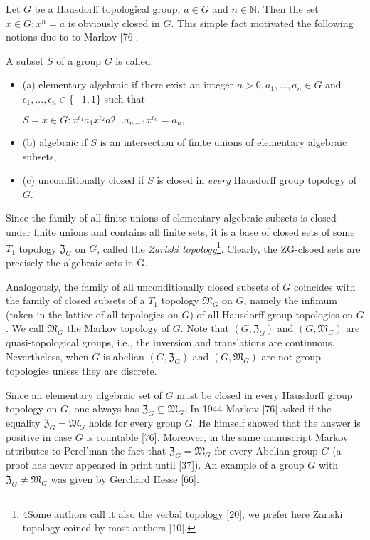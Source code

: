 \documentclass[12pt]{article}
\begin{document}
        Let $G$ be a Hausdorff topological group, $a \in G$ and $n \in \mathbb{N}$. Then the set ${x \in G : x^n = a}$ is obviously closed
    in $G$. This simple fact motivated the following notions due to to Markov [76].
    
    
        A subset $S$ of a group $G$ is called:

    
        \begin{itemize}

            \item (a) elementary algebraic if there exist an integer $n > 0, a_1, . . . , a_n \in G$ and $\epsilon_1, . . . , \epsilon_n \in \{-1, 1\}$ such that


                $S = {x \in G : x^{\epsilon_1} a_1 x^{\epsilon_2} a2 . . . a_{n-1} x^{\epsilon_n} = a_n},$


            \item (b) algebraic if $S$ is an intersection of finite unions of elementary algebraic subsets,

            \item (c) unconditionally closed if $S$ is closed in \emph{every} Hausdorff group topology of $G$.

        \end{itemize}

        Since the family of all finite unions of elementary algebraic subsets is closed under finite unions and contains
    all finite sets, it is a base of closed sets of some $T_1$ topology $\mathfrak{Z}_G$ on $G$, called
    the \emph{Zariski topology}\footnote[4]{4Some authors call it also the verbal topology [20], we prefer here Zariski topology coined by most authors [10].}.
    Clearly, the ZG-clsoed sets are precisely the algebraic sets in G.
    
    
        Analogously, the family of all unconditionally closed subsets of $G$ coincides with the family of closed subsets
    of a $T_1$ topology $\mathfrak{M}_G$ on $G$, namely the infimum (taken in the lattice of all topologies on $G$) of all Hausdorff group
    topologies on $G$. We call $\mathfrak{M}_G$ the Markov topology of $G$. Note that $(G, \mathfrak{Z}_G)$ and $(G,\mathfrak{M}_G)$ are quasi-topological
    groups, i.e., the inversion and translations are continuous. Nevertheless, when $G$ is abelian $(G, \mathfrak{Z}_G)$ and $(G,\mathfrak{M}_G)$
    are not group topologies unless they are discrete.
    
    
        Since an elementary algebraic set of $G$ must be closed in every Hausdorff group topology on $G$, one always
    has $\mathfrak{Z}_G \subseteq \mathfrak{M}_G$. In 1944 Markov [76] asked if the equality $\mathfrak{Z}_G = \mathfrak{M}_G$ holds for every group $G$. He himself showed
    that the answer is positive in case $G$ is countable [76]. Moreover, in the same manuscript Markov attributes to
    Perel'man the fact that $\mathfrak{Z}_G = \mathfrak{M}_G$ for every Abelian group $G$ (a proof has never appeared in print until [37]).
    An example of a group $G$ with $\mathfrak{Z}_G \neq \mathfrak{M}_G$ was given by Gerchard Hesse [66].
\end{document}
